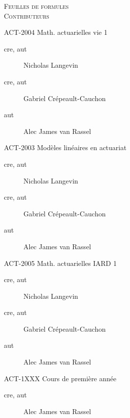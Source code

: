 \documentclass[10pt, french]{article}
\begin{document}
\center %

\textsc{\LARGE Feuilles de formules}\\[0.5cm]
\textsc{\Large Contributeurs}\\[0.5cm] 

\begin{multicols*}{3}

\begin{vie}{ACT-2004\: Math. actuarielles vie 1}
\begin{description}
	\item[cre, aut] Nicholas Langevin
	\item[cre, aut] Gabriel Crépeault-Cauchon 
	\item[aut] Alec James van Rassel
\end{description}
\end{vie}

\begin{modeles}{ACT-2003\: Modèles linéaires en actuariat}
\begin{description}
	\item[cre, aut] Nicholas Langevin
	\item[cre, aut] Gabriel Crépeault-Cauchon 
	\item[aut] Alec James van Rassel
\end{description}
\end{modeles}

\begin{IARD}{ACT-2005\: Math. actuarielles IARD 1}
\begin{description}
	\item[cre, aut] Nicholas Langevin
	\item[cre, aut] Gabriel Crépeault-Cauchon 
	\item[aut] Alec James van Rassel
\end{description}
\end{IARD}

\begin{1XXX}{ACT-1XXX\: Cours de première année}
\begin{description}
	\item[cre, aut] Alec James van Rassel
\end{description}
\end{1XXX}

\end{multicols*}
\end{document}
